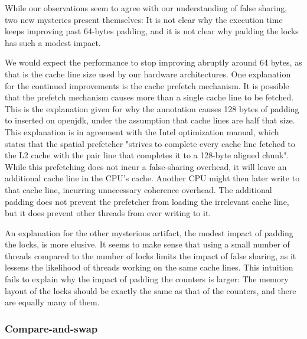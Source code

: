 While our observations seem to agree with our understanding of false sharing,
two new mysteries present themselves: It is not clear why the execution time
keeps improving past 64-bytes padding, and it is not clear why padding the locks
has such a modest impact.

We would expect the performance to stop improving abruptly around 64
bytes, as that is the cache line size used by our hardware architectures.
One explanation for the continued improvements is the cache prefetch mechanism.
It is possible that the prefetch mechanism causes more than a single cache line
to be fetched. This is the explanation given for why the 
annotation causes 128 bytes of padding to inserted on openjdk, under the
assumption that cache lines are half that size\cite{openjdkmailcontended}.
This explanation is in agreement with the Intel optimization
manual\cite{inteloptimize}, which states that the spatial prefetcher
"strives to complete every cache line fetched to the L2 cache with the pair line
that completes it to a 128-byte aligned chunk"\footnotemark. While this
prefetching does not incur a false-sharing overhead, it will leave an additional
cache line in the CPU's cache. Another CPU might then later write to that
cache line, incurring unnecessary coherence overhead. The additional padding
does not prevent the prefetcher from loading the irrelevant cache line, but it
does prevent other threads from ever writing to it.

An explanation for the other mysterious artifact, the modest impact of padding
the locks, is more elusive. It seems to make sense that using a small number of
threads compared to the number of locks limits the impact of false sharing, as
it lessens the likelihood of threads working on the same cache lines. This
intuition fails to explain why the impact of padding the counters is larger: The
memory layout of the locks should be exactly the same as that of the counters,
and there are equally many of them.




\subsubsection{Compare-and-swap}

